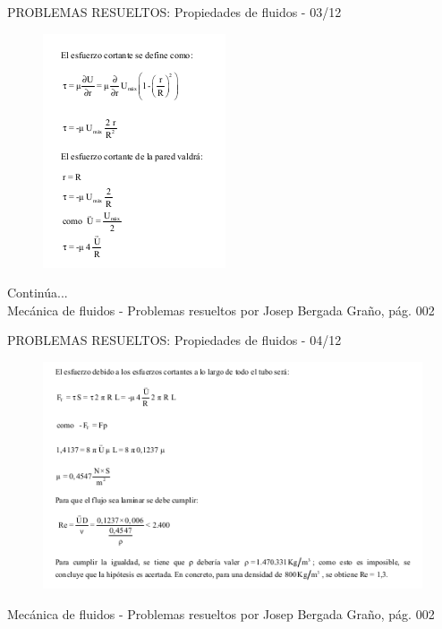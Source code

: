 \begin{frame}{PROBLEMAS RESUELTOS: Propiedades de fluidos - 03/12}
\justifying
\begin{figure}[H]
\centering
\includegraphics[scale=0.4]{Section_Files/S2-imagenes-Jhon/Book-ProbResuelts/P01-E03.png}
\end{figure}
Continúa...\\
{\tiny Mecánica de fluidos - Problemas resueltos por Josep Bergada Graño, pág. 002}
\end{frame}

\begin{frame}{PROBLEMAS RESUELTOS: Propiedades de fluidos - 04/12}
\justifying
\begin{figure}[H]
\centering
\includegraphics[scale=0.4]{Section_Files/S2-imagenes-Jhon/Book-ProbResuelts/P01-E04.png}
\end{figure}
{\tiny Mecánica de fluidos - Problemas resueltos por Josep Bergada Graño, pág. 002}
\end{frame}

